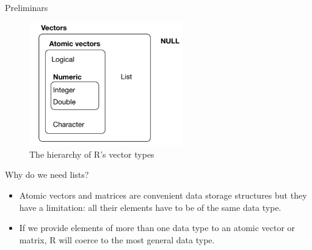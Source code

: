 \documentclass[ignorenonframetext,]{beamer}
\begin{document}
\begin{frame}{Preliminars}
\protect\hypertarget{preliminars-1}{}

\begin{figure}
\centering
\includegraphics[width=2.60417in,height=\textheight]{figures/vec}
\caption{The hierarchy of R's vector types}
\end{figure}

\end{frame}

\begin{frame}{Why do we need lists?}
\protect\hypertarget{why-do-we-need-lists}{}

\begin{itemize}
\item
  Atomic vectors and matrices are convenient data storage structures but
  they have a limitation: all their elements have to be of the same data
  type.
\item
  If we provide elements of more than one data type to an atomic vector
  or matrix, R will coerce to the most general data type.
\end{itemize}

\end{frame}
\end{document}
